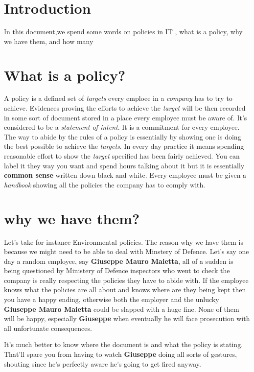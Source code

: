 \documentclass[a4paper,12pt]{article}
\begin{document}
\tableofcontents

\section{Introduction}
In this document,we spend some words on policies in IT , what is a policy, why we have them, and how many 

\clearpage

\section{What is a policy?}
A policy is a defined set of \emph{targets} every emploee in a \emph{company} has to try to achieve. Evidences proving the efforts to achieve the \emph{target} will be then recorded in some sort of document stored in a place every employee must be aware of. It's considered to be a \emph{statement of intent}. It is a commitment for every employee. The way to abide by the rules of a policy is essentially by showing one is doing the best possible to achieve the \emph{targets}. In every day practice it means spending reasonable effort to show the \emph{target} specified has been fairly achieved. You can label it they way you want and spend hours talking about it but it is essentially \textbf{common sense} written down black and white.
Every employee must be given a \emph{handbook} showing all the policies the company has to comply with.

\section{why we have them?}

Let's take for instance Environmental policies. The reason why we have them is because we might need to be able to deal with Minstery of Defence. Let's say one day a random employee, say \textbf{Giuseppe Mauro Maietta}, all of a sudden is being questioned by Ministery of Defence inspectors who went to check the company is really respecting the policies they have to abide with. If the employee knows what the policies are all about and knows where are they being kept then you have a happy ending, otherwise both the employer and the unlucky \textbf{Giuseppe Mauro Maietta} could be slapped with a huge fine. None of them will be happy, especially \textbf{Giuseppe} when eventually he will face prosecution with all unfortunate consequences. 

It's much better to know where the document is and what the policy is stating. That'll spare you from having to watch \textbf{Giuseppe} doing all sorts of gestures, shouting since he's perfectly aware he's going to get fired anyway.
\end{document}

